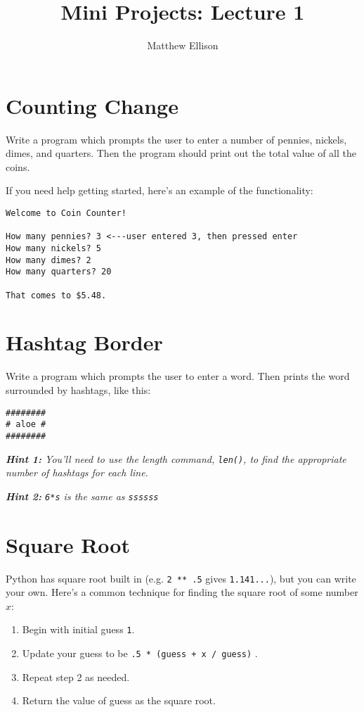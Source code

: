 \documentclass{hitec}
\title{Mini Projects: Lecture 1}
\author{Matthew Ellison}
\begin{document}
\maketitle

\section{Counting Change}
Write a program which prompts the user to enter a number of pennies, nickels, dimes, and quarters. Then the program should print out the total value of all the coins.

\noindent If you need help getting started, here's an example of the functionality:

\begin{verbatim}
Welcome to Coin Counter!

How many pennies? 3 <---user entered 3, then pressed enter
How many nickels? 5
How many dimes? 2
How many quarters? 20

That comes to $5.48.	
\end{verbatim}

\section{Hashtag Border}
Write a program which prompts the user to enter a word. Then prints the word surrounded by hashtags, like this:

\begin{verbatim}
########
# aloe #
########
\end{verbatim}

\noindent \emph{\textbf{Hint 1:} You'll need to use the length command, \texttt{len()}, to find the appropriate number of hashtags for each line.}

\noindent \emph{\textbf{Hint 2:} \texttt{6*\textquotesingle s\textquotesingle} is the same as \texttt{\textquotesingle ssssss\textquotesingle}}

\section{Square Root}
Python has square root built in (e.g. \texttt{2 ** .5} gives \texttt{1.141...}), but you can write your own. Here's a common technique for finding the square root of some number $x$:

\begin{enumerate}
	\item Begin with initial guess \texttt{1}.
	\item Update your guess to be \texttt{.5 * (guess + x / guess)} .
	\item Repeat step 2 as needed.
	\item Return the value of guess as the square root.
\end{enumerate}
\end{document}
